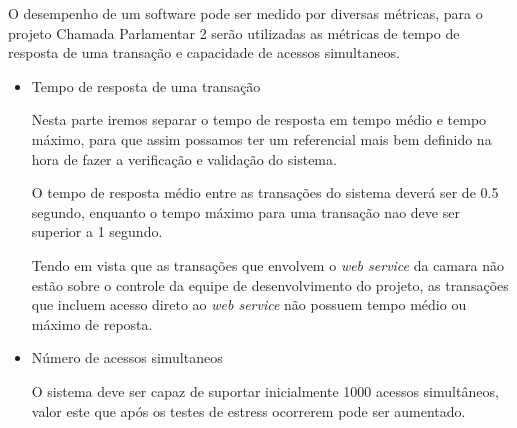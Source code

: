 



O desempenho de um software pode ser medido por diversas métricas, para o projeto Chamada Parlamentar 2 serão utilizadas as métricas de tempo de resposta de uma transação e capacidade de acessos simultaneos.

\begin{itemize}

	\item{Tempo de resposta de uma transação}

		Nesta parte iremos separar o tempo de resposta em tempo médio e tempo máximo, para que assim possamos ter um referencial mais bem definido na hora de fazer a verificação e validação do sistema.

		O tempo de resposta médio entre as transações do sistema deverá ser de 0.5 segundo, enquanto o tempo máximo para uma transação nao deve ser superior a 1 segundo.

		Tendo em vista que as transações que envolvem o \textit{web service} da camara não estão sobre o controle da equipe de desenvolvimento do projeto, as transações que incluem acesso direto ao \textit{web service} não possuem tempo médio ou máximo de reposta.

	\item{Número de acessos simultaneos}

		O sistema deve ser capaz de suportar inicialmente 1000 acessos simultâneos, valor este que após os testes de estress ocorrerem pode ser aumentado.

\end{itemize}